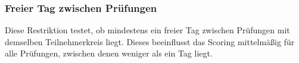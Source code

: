 \subsubsection{Freier Tag zwischen Prüfungen}\label{subsubsec:freierTagZwischenPruefungen}
Diese Restriktion testet, ob mindestens ein freier Tag zwischen Prüfungen mit demselben Teilnehmerkreis liegt.
Dieses beeinflusst das Scoring mittelmäßig für alle Prüfungen, zwischen denen weniger als ein Tag liegt.